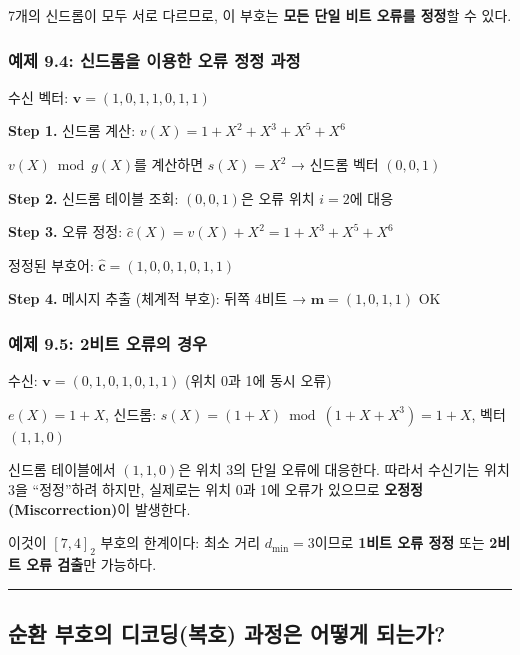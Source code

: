 \documentclass[
  oneside]{article}
\begin{document}
7개의 신드롬이 모두 서로 다르므로, 이 부호는 \textbf{모든 단일 비트
오류를 정정}할 수 있다.

\subsubsection{예제 9.4: 신드롬을 이용한 오류 정정
과정}\label{uxc608uxc81c-9.4-uxc2e0uxb4dcuxb86cuxc744-uxc774uxc6a9uxd55c-uxc624uxb958-uxc815uxc815-uxacfcuxc815}

수신 벡터: \(\mathbf{v} = (1, 0, 1, 1, 0, 1, 1)\)

\textbf{Step 1.} 신드롬 계산: \(v(X) = 1 + X^2 + X^3 + X^5 + X^6\)

\(v(X) \bmod g(X)\)를 계산하면 \(s(X) = X^2\) → 신드롬 벡터
\((0, 0, 1)\)

\textbf{Step 2.} 신드롬 테이블 조회: \((0, 0, 1)\)은 오류 위치
\(i = 2\)에 대응

\textbf{Step 3.} 오류 정정:
\(\hat{c}(X) = v(X) + X^2 = 1 + X^3 + X^5 + X^6\)

정정된 부호어: \(\hat{\mathbf{c}} = (1, 0, 0, 1, 0, 1, 1)\)

\textbf{Step 4.} 메시지 추출 (체계적 부호): 뒤쪽 4비트 →
\(\mathbf{m} = (1, 0, 1, 1)\) OK

\subsubsection{예제 9.5: 2비트 오류의
경우}\label{uxc608uxc81c-9.5-2uxbe44uxd2b8-uxc624uxb958uxc758-uxacbduxc6b0}

수신: \(\mathbf{v} = (0, 1, 0, 1, 0, 1, 1)\) (위치 0과 1에 동시 오류)

\(e(X) = 1 + X\), 신드롬:
\(s(X) = (1 + X) \bmod (1 + X + X^3) = 1 + X\), 벡터 \((1, 1, 0)\)

신드롬 테이블에서 \((1, 1, 0)\)은 위치 3의 단일 오류에 대응한다. 따라서
수신기는 위치 3을 ``정정''하려 하지만, 실제로는 위치 0과 1에 오류가
있으므로 \textbf{오정정(Miscorrection)}이 발생한다.

이것이 \([7, 4]_2\) 부호의 한계이다: 최소 거리 \(d_{\min} = 3\)이므로
\textbf{1비트 오류 정정} 또는 \textbf{2비트 오류 검출}만 가능하다.

\begin{center}\rule{0.5\linewidth}{0.5pt}\end{center}

\subsection{순환 부호의 디코딩(복호) 과정은 어떻게
되는가?}\label{uxc21cuxd658-uxbd80uxd638uxc758-uxb514uxcf54uxb529uxbcf5uxd638-uxacfcuxc815uxc740-uxc5b4uxb5bbuxac8c-uxb418uxb294uxac00}
\end{document}
